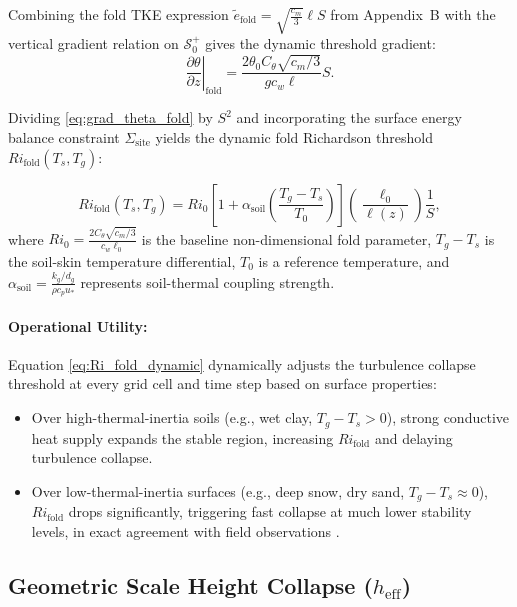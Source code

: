 Combining the fold TKE expression $\tilde e_{\mathrm{fold}} = \sqrt{\frac{c_m}{3}} \ell S$ from Appendix~B with the vertical gradient relation on $\mathcal{S}_0^+$ gives the dynamic threshold gradient:
\begin{equation}
\left.\frac{\partial \theta}{\partial z}\right\vert_{\mathrm{fold}} = \frac{2 \theta_0 C_\theta \sqrt{c_m/3}}{g c_w \ell} S.
\label{eq:grad_theta_fold}
\end{equation}

Dividing \eqref{eq:grad_theta_fold} by $S^2$ and incorporating the surface energy balance constraint $\Sigma_{\mathrm{site}}$ yields the dynamic fold Richardson threshold $Ri_{\mathrm{fold}}(T_s, T_g)$:

\begin{equation}
\boxed{
Ri_{\mathrm{fold}}(T_s, T_g) = Ri_0 \left[ 1 + \alpha_{\mathrm{soil}} \left( \frac{T_g - T_s}{T_0} \right) \right] \left( \frac{\ell_0}{\ell(z)} \right) \frac{1}{S},
}
\label{eq:Ri_fold_dynamic}
\end{equation}
where $Ri_0 = \frac{2 C_\theta \sqrt{c_m/3}}{c_w \ell_0}$ is the baseline non-dimensional fold parameter, $T_g - T_s$ is the soil-skin temperature differential, $T_0$ is a reference temperature, and $\alpha_{\mathrm{soil}} = \frac{k_g / d_g}{\rho c_p u_*}$ represents soil-thermal coupling strength.

\paragraph{Operational Utility:}
Equation \eqref{eq:Ri_fold_dynamic} dynamically adjusts the turbulence collapse threshold at every grid cell and time step based on surface properties:
\begin{itemize}
    \item Over high-thermal-inertia soils (e.g., wet clay, $T_g - T_s > 0$), strong conductive heat supply expands the stable region, increasing $Ri_{\mathrm{fold}}$ and delaying turbulence collapse.
    \item Over low-thermal-inertia surfaces (e.g., deep snow, dry sand, $T_g - T_s \approx 0$), $Ri_{\mathrm{fold}}$ drops significantly, triggering fast collapse at much lower stability levels, in exact agreement with field observations \citep{Poulos2002CASES99, Uttal2002SHEBA}.
\end{itemize}

\subsection{Geometric Scale Height Collapse ($h_{\mathrm{eff}}$)}

